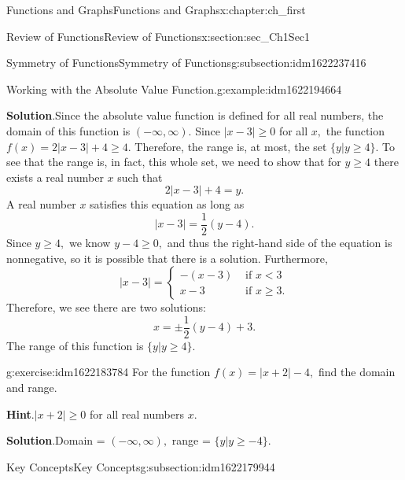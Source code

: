 \documentclass[oneside,10pt,]{book}
\newcommand{\blocktitlefont}{\relax}
\numberwithin{equation}{section}
\newcommand{\lt}{<}
\newcommand{\amp}{&}
\begin{document}
\begin{chapterptx}{Functions and Graphs}{}{Functions and Graphs}{}{}{x:chapter:ch_first}
\begin{sectionptx}{Review of Functions}{}{Review of Functions}{}{}{x:section:sec_Ch1Sec1}
\begin{subsectionptx}{Symmetry of Functions}{}{Symmetry of Functions}{}{}{g:subsection:idm1622237416}
\begin{example}{Working with the Absolute Value Function.}{g:example:idm1622194664}
\par\smallskip%
\noindent\textbf{\blocktitlefont Solution}.\hypertarget{g:solution:idm1622193768}{}\quad{}Since the absolute value function is defined for all real numbers, the domain of this function is \((-\infty,\infty).\) Since \(|x-3|\geq 0\) for all \(x,\) the function \(f(x)=2|x-3|+4\geq 4.\) Therefore, the range is, at most, the set \(\{y|y\geq 4\}.\) To see that the range is, in fact, this whole set, we need to show that for \(y\geq 4\) there exists a real number \(x\) such that%
%
\begin{equation*}
2|x-3|+4=y.
\end{equation*}
A real number \(x\) satisfies this equation as long as%
%
\begin{equation*}
|x-3|=\frac{1}{2}(y-4).
\end{equation*}
Since \(y\geq 4,\) we know \(y-4\geq 0,\) and thus the right-hand side of the equation is nonnegative, so it is possible that there is a solution. Furthermore,%
%
\begin{equation*}
|x-3|=\begin{cases}-(x-3) \amp \text{ if } x\lt  3 \\x-3 \amp \text{ if }x \geq 3. \end{cases}
\end{equation*}
Therefore, we see there are two solutions:%
%
\begin{equation*}
x=\pm\frac{1}{2}(y-4)+3.
\end{equation*}
The range of this function is \(\{y|y\geq 4\}.\)%
\end{example}
\begin{inlineexercise}{}{g:exercise:idm1622183784}%
For the function \(f(x)=|x+2|-4,\) find the domain and range.%
\par\smallskip%
\noindent\textbf{\blocktitlefont Hint}.\hypertarget{g:hint:idm1622185832}{}\quad{}\(|x+2|\geq 0\) for all real numbers \(x.\)%
\par\smallskip%
\noindent\textbf{\blocktitlefont Solution}.\hypertarget{g:solution:idm1622182760}{}\quad{}Domain = \((-\infty,\infty),\) range = \(\{y|y\geq -4\}.\)%
\end{inlineexercise}%
\end{subsectionptx}
%
%
\typeout{************************************************}
\typeout{************************************************}
%
\begin{subsectionptx}{Key Concepts}{}{Key Concepts}{}{}{g:subsection:idm1622179944}
%
\begin{enumerate}

\end{enumerate}
\end{subsectionptx}
\end{sectionptx}
\end{chapterptx}
\end{document}

